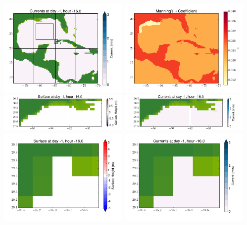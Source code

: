 \documentclass[11pt]{article}
\begin{document}
\includegraphics[width=0.475\textwidth]{frame0032fig2.png}
\vskip 10pt 
\includegraphics[width=0.475\textwidth]{frame0032fig3.png}
\includegraphics[width=0.475\textwidth]{frame0032fig4.png}
\vskip 10pt 
\includegraphics[width=0.475\textwidth]{frame0032fig5.png}
\includegraphics[width=0.475\textwidth]{frame0032fig6.png}
\vskip 10pt 
\includegraphics[width=0.475\textwidth]{frame0032fig7.png}
\end{document}
